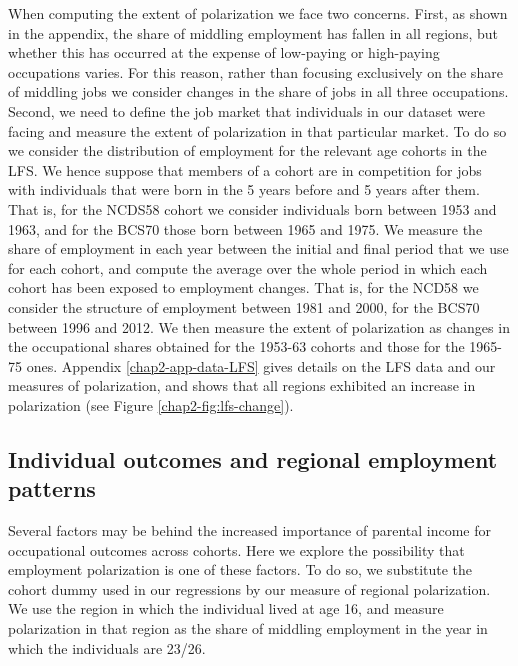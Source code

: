 When computing the extent of polarization we face two concerns. First, as shown in the appendix, the share of middling employment has fallen in all regions, but whether this has occurred at the expense of low-paying or high-paying occupations varies. For this reason, rather than focusing exclusively on the share of middling jobs we consider changes in the share of jobs in all three occupations. Second, we need to define the job market that individuals in our dataset were facing and measure the extent of polarization in that particular market. To do so we consider the distribution of employment for the relevant age cohorts in the LFS. We hence suppose that members of a cohort are in competition for jobs with individuals that were born in the 5 years before and 5 years after them. That is, for the NCDS58 cohort we consider individuals born between 1953 and 1963, and for the BCS70 those born between 1965 and 1975. We measure the share of employment in each year between the initial and final period that we use for each cohort, and compute the average over the whole period in which each cohort has been exposed to employment changes. That is, for the NCD58 we consider the structure of employment between 1981 and 2000, for the BCS70 between 1996 and 2012. We then measure the extent of polarization as changes in the occupational shares obtained for the 1953-63 cohorts and those for the 1965-75 ones. Appendix \ref{chap2-app-data-LFS} gives details on the LFS data and our measures of polarization, and shows that all regions exhibited an increase in polarization (see Figure \ref{chap2-fig:lfs-change}).


\subsection{Individual outcomes and regional employment patterns}

Several factors may be behind the increased importance of parental income for occupational outcomes across cohorts. Here we explore the possibility that employment polarization is one of these factors. To do so, we substitute the cohort dummy used in our regressions by our measure of regional polarization. We use the region in which the individual lived at age 16, and measure polarization in that region as the share of middling employment in the year in which the individuals are 23/26.

